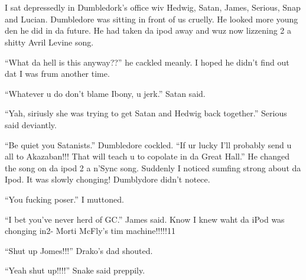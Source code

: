 \section[da blak parade]{\protect{}}

\begin{sloppypar}
\end{sloppypar}


I sat depressedly in Dumbledork's office wiv Hedwig, Satan, James, Serious, Snap and Lucian. Dumbledore was sitting in front of us cruelly. He looked more young den he did in da future. He had taken da ipod away and wuz now lizzening 2 a shitty Avril Levine song.

\enquote{What da hell is this anyway??} he cackled meanly. I hoped he didn't find out dat I was frum another time.

\enquote{Whatever u do don't blame Ibony, u jerk.} Satan said.

\enquote{Yah, siriusly she was trying to get Satan and Hedwig back together.} Serious said deviantly.

\enquote{Be quiet you Satanists.} Dumbledore cockled. \enquote{If ur lucky I'll probably send u all to Akazaban!!! That will teach u to copolate in da Great Hall.} He changed the song on da ipod 2 a n'Sync song. Suddenly I noticed sumfing strong about da Ipod. It was slowly chonging! Dumblydore didn't notece.

\enquote{You fucking poser.} I muttoned.

\enquote{I bet you've never herd of GC.} James said. Know I knew waht da iPod was chonging in2- Morti McFly's tim machine!!!!!11

\enquote{Shut up Jomes!!!} Drako's dad shouted.

\enquote{Yeah shut up!!!!} Snake said preppily.

